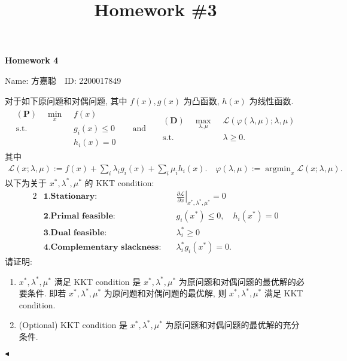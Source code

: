 \documentclass[11pt]{article}
\title{Homework \#3}
\newenvironment{problem}[2][Problem]{\begin{trivlist}
    \item[\hskip \labelsep {\bfseries #1}\hskip \labelsep {\bfseries #2.}]\songti}{\hfill$\blacktriangleleft$\end{trivlist}}
\newcommand\1{\mathds{1}}
\DeclareMathOperator*{\argmin}{argmin} %
\begin{document}
\kaishu

\pagestyle{fancy}
\chead{\kaishu }
\fancyfoot[R]{} 
\fancyfoot[C]{\thepage\ /\ \pageref{LastPage} \\ \textcolor{lightgray}{Last Compile: \today}}


\begin{center}
    {\LARGE \bf Homework 4}

    {Name: 方嘉聪\ \  ID: 2200017849}            %
\end{center}

\begin{problem}{1}
    对于如下原问题和对偶问题, 其中 $f(x), g(x)$ 为凸函数, $h(x)$ 为线性函数. 
    \begin{align*}
        \begin{aligned}
            \mathbf{(P)}\quad \min_x \,\,  & f(x) \\
            \text{s.t.} \,\, & g_i(x) \le 0 \\
            & h_i(x) = 0
        \end{aligned}
        && \text{and} &&
        \begin{aligned}
            \mathbf{(D)}\quad \max_{\lambda, \mu} \,\,  & \mathcal{L}(\varphi(\lambda, \mu); \lambda, \mu) \\
            \text{s.t.} \,\, & \lambda \ge 0.
        \end{aligned}
    \end{align*}
    其中
    \begin{align*}
        \mathcal{L}(x;\lambda, \mu) := f(x) + \sum_i \lambda_i g_i(x) + \sum_i \mu_i h_i(x). \quad \varphi(\lambda, \mu) := \argmin_x \mathcal{L}(x;\lambda, \mu).
    \end{align*}
    以下为关于 $x^*, \lambda^*, \mu^*$ 的 KKT condition:
    \begin{alignat}{2}
        \label{eq:1}
        &\textbf{1.Stationary:} \quad  &\left.\frac{\partial \mathcal{L}}{\partial x}\right|_{x^*, \lambda^*, \mu^*}  =  0 \\
        \label{eq:2}
        &\textbf{2.Primal feasible:} \quad &g_i(x^*)  \leq  0,\quad h_i(x^*) = 0 \\
        \label{eq:3}
        &\textbf{3.Dual feasible:} \quad  &\lambda_i^*  \geq  0 \\
        \label{eq:4}
        &\textbf{4.Complementary slackness:} \quad  &\lambda_i^* g_i(x^*)  =  0.
    \end{alignat}
    请证明:
    \begin{enumerate}
        \item $x^*, \lambda^*, \mu^*$ 满足 KKT condition 是 $x^*, \lambda^*, \mu^*$ 为原问题和对偶问题的最优解的必要条件. 即若 $x^*, \lambda^*, \mu^*$ 为原问题和对偶问题的最优解, 则 $x^*, \lambda^*, \mu^*$ 满足 KKT condition.
        \item (Optional) KKT condition 是 $x^*, \lambda^*, \mu^*$ 为原问题和对偶问题的最优解的充分条件.
    \end{enumerate}
\end{problem}
\end{document}
